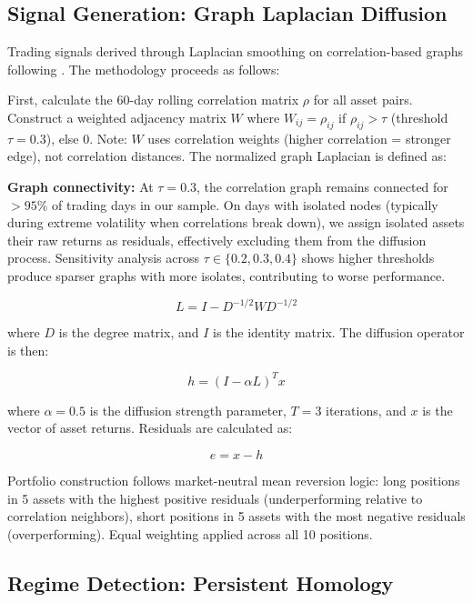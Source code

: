 \subsection{Signal Generation: Graph Laplacian Diffusion}

Trading signals derived through Laplacian smoothing on correlation-based graphs following \citet{Kondor2002}. The methodology proceeds as follows:

First, calculate the 60-day rolling correlation matrix $\rho$ for all asset pairs. Construct a weighted adjacency matrix $W$ where $W_{ij} = \rho_{ij}$ if $\rho_{ij} > \tau$ (threshold $\tau = 0.3$), else 0. Note: $W$ uses correlation weights (higher correlation = stronger edge), not correlation distances. The normalized graph Laplacian is defined as:

\textbf{Graph connectivity:} At $\tau = 0.3$, the correlation graph remains connected for $>95\%$ of trading days in our sample. On days with isolated nodes (typically during extreme volatility when correlations break down), we assign isolated assets their raw returns as residuals, effectively excluding them from the diffusion process. Sensitivity analysis across $\tau \in \{0.2, 0.3, 0.4\}$ shows higher thresholds produce sparser graphs with more isolates, contributing to worse performance.

\begin{equation}
L = I - D^{-1/2}WD^{-1/2}
\end{equation}

where $D$ is the degree matrix, and $I$ is the identity matrix. The diffusion operator is then:

\begin{equation}
h = (I - \alpha L)^T x
\end{equation}

where $\alpha = 0.5$ is the diffusion strength parameter, $T = 3$ iterations, and $x$ is the vector of asset returns. Residuals are calculated as:

\begin{equation}
e = x - h
\end{equation}

Portfolio construction follows market-neutral mean reversion logic: long positions in 5 assets with the highest positive residuals (underperforming relative to correlation neighbors), short positions in 5 assets with the most negative residuals (overperforming). Equal weighting applied across all 10 positions.

\subsection{Regime Detection: Persistent Homology}

